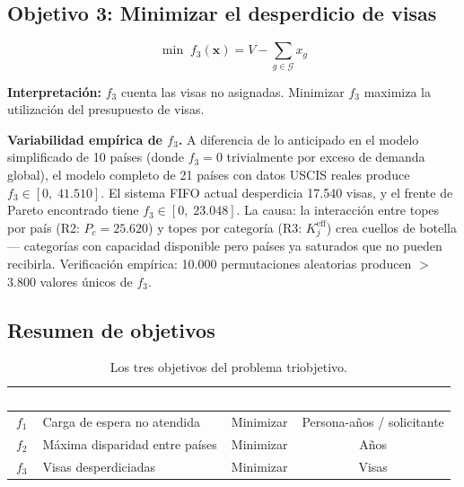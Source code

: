 \documentclass[12pt,letterpaper]{article}
\begin{document}
\subsection{Objetivo 3: Minimizar el desperdicio de visas}

\begin{formulabox}
\begin{equation}
\min \; f_3(\mathbf{x}) = V - \sum_{g \in \mathcal{G}} x_g
\label{eq:obj3_fase2}
\end{equation}
\end{formulabox}

\textbf{Interpretación:} $f_3$ cuenta las visas no asignadas. Minimizar $f_3$ maximiza la utilización del presupuesto de visas.

\begin{yellowbox}
\textbf{Variabilidad empírica de $f_3$.} A diferencia de lo anticipado en el modelo simplificado de 10 países (donde $f_3 = 0$ trivialmente por exceso de demanda global), el modelo completo de 21 países con datos USCIS reales produce $f_3 \in [0,\; 41.510]$. El sistema FIFO actual desperdicia 17.540 visas, y el frente de Pareto encontrado tiene $f_3 \in [0,\; 23.048]$. La causa: la interacción entre topes por país (R2: $P_c = 25.620$) y topes por categoría (R3: $K_j^{\text{eff}}$) crea cuellos de botella --- categorías con capacidad disponible pero países ya saturados que no pueden recibirla. Verificación empírica: 10.000 permutaciones aleatorias producen $>$3.800 valores únicos de $f_3$.
\end{yellowbox}

\subsection{Resumen de objetivos}

\begin{table}[H]
\centering
\caption{Los tres objetivos del problema triobjetivo.}
\label{tab:resumen_obj}
\renewcommand{\arraystretch}{1.4}
\begin{tabular}{clcc}
\toprule
\rowcolor{tablehead}
\textcolor{white}{\textbf{ID}} & \textcolor{white}{\textbf{Descripción}} & \textcolor{white}{\textbf{Dirección}} & \textcolor{white}{\textbf{Unidad}} \\
\midrule
$f_1$ & Carga de espera no atendida & Minimizar & Persona-años / solicitante \\
\rowcolor{gray!8}
$f_2$ & Máxima disparidad entre países & Minimizar & Años \\
$f_3$ & Visas desperdiciadas & Minimizar & Visas \\
\bottomrule
\end{tabular}
\end{table}
\end{document}

